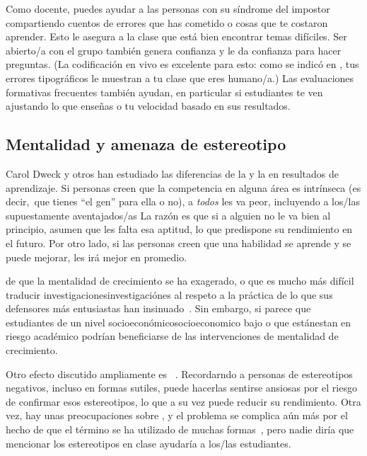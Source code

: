 Como docente,
puedes ayudar a las personas con su síndrome del impostor
compartiendo cuentos de errores que has cometido o cosas que te costaron aprender.
Esto le asegura a la clase que está bien encontrar temas difíciles.
Ser abierto/a con el grupo también genera confianza
y le da confianza para hacer preguntas.
(La codificación en vivo es excelente para esto:
como se indicó en ,
tus errores tipográficos le muestran a tu clase que eres humano/a.)
Las evaluaciones formativas frecuentes también ayudan,
en particular si estudiantes te ven ajustando lo que enseñas o tu velocidad
basado en sus resultados.

\subsection*{Mentalidad y amenaza de estereotipo}

Carol Dweck y otros
han estudiado las diferencias de la 
y la  en resultados de aprendizaje.
Si personas creen que la competencia en alguna área es intrínseca
(es decir,\ que tienes ``el gen'' para ella o no),
a \emph{todos} les va peor,
incluyendo a los/las supuestamente aventajados/as
La razón es que si a alguien no le va bien al principio,
asumen que les falta esa aptitud,
lo que predispone su rendimiento en el futuro.
Por otro lado,
si las personas creen que una habilidad se aprende y se puede mejorar,
les irá mejor en promedio.

de que la mentalidad de crecimiento se ha exagerado,
o que es mucho más difícil traducir investigacionesinvestigaciónes al respeto a la práctica
de lo que sus defensores más entusiastas han insinuado~\cite{Sisk2018}.
Sin embargo,
si parece que estudiantes de un nivel socioeconómicosocioeconomico bajo o que estánestan en riesgo académico podrían beneficiarse de las intervenciones de mentalidad de crecimiento.

Otro efecto discutido ampliamente es ~\cite{Stee2011}.
Recordarndo a personas de estereotipos negativos,
incluso en formas sutiles,
puede hacerlas sentirse ansiosas por el riesgo de confirmar esos estereotipos,
lo que a su vez puede reducir su rendimiento.
Otra vez,
hay unas preocupaciones sobre
,
y el problema se complica aún más por el hecho de que el término se ha utilizado de muchas formas~\cite{Shap2007},
pero nadie diría que mencionar los estereotipos en clase ayudaría a los/las estudiantes.

